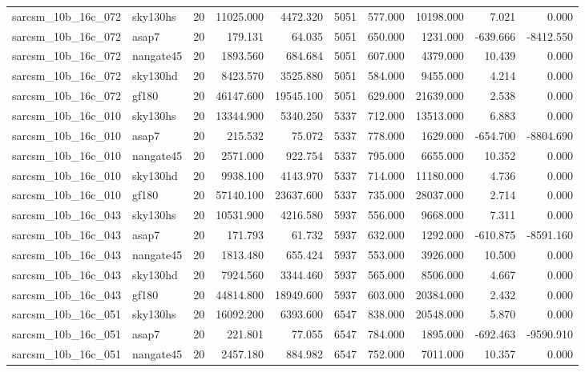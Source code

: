 \begin{longtable}{llrrrrrrrr}
sarcsm\_10b\_16c\_072 & sky130hs & 20 & 11025.000 & 4472.320 & 5051 & 577.000 & 10198.000 & 7.021 & 0.000 \\
sarcsm\_10b\_16c\_072 & asap7 & 20 & 179.131 & 64.035 & 5051 & 650.000 & 1231.000 & -639.666 & -8412.550 \\
sarcsm\_10b\_16c\_072 & nangate45 & 20 & 1893.560 & 684.684 & 5051 & 607.000 & 4379.000 & 10.439 & 0.000 \\
sarcsm\_10b\_16c\_072 & sky130hd & 20 & 8423.570 & 3525.880 & 5051 & 584.000 & 9455.000 & 4.214 & 0.000 \\
sarcsm\_10b\_16c\_072 & gf180 & 20 & 46147.600 & 19545.100 & 5051 & 629.000 & 21639.000 & 2.538 & 0.000 \\
sarcsm\_10b\_16c\_010 & sky130hs & 20 & 13344.900 & 5340.250 & 5337 & 712.000 & 13513.000 & 6.883 & 0.000 \\
sarcsm\_10b\_16c\_010 & asap7 & 20 & 215.532 & 75.072 & 5337 & 778.000 & 1629.000 & -654.700 & -8804.690 \\
sarcsm\_10b\_16c\_010 & nangate45 & 20 & 2571.000 & 922.754 & 5337 & 795.000 & 6655.000 & 10.352 & 0.000 \\
sarcsm\_10b\_16c\_010 & sky130hd & 20 & 9938.100 & 4143.970 & 5337 & 714.000 & 11180.000 & 4.736 & 0.000 \\
sarcsm\_10b\_16c\_010 & gf180 & 20 & 57140.100 & 23637.600 & 5337 & 735.000 & 28037.000 & 2.714 & 0.000 \\
sarcsm\_10b\_16c\_043 & sky130hs & 20 & 10531.900 & 4216.580 & 5937 & 556.000 & 9668.000 & 7.311 & 0.000 \\
sarcsm\_10b\_16c\_043 & asap7 & 20 & 171.793 & 61.732 & 5937 & 632.000 & 1292.000 & -610.875 & -8591.160 \\
sarcsm\_10b\_16c\_043 & nangate45 & 20 & 1813.480 & 655.424 & 5937 & 553.000 & 3926.000 & 10.500 & 0.000 \\
sarcsm\_10b\_16c\_043 & sky130hd & 20 & 7924.560 & 3344.460 & 5937 & 565.000 & 8506.000 & 4.667 & 0.000 \\
sarcsm\_10b\_16c\_043 & gf180 & 20 & 44814.800 & 18949.600 & 5937 & 603.000 & 20384.000 & 2.432 & 0.000 \\
sarcsm\_10b\_16c\_051 & sky130hs & 20 & 16092.200 & 6393.600 & 6547 & 838.000 & 20548.000 & 5.870 & 0.000 \\
sarcsm\_10b\_16c\_051 & asap7 & 20 & 221.801 & 77.055 & 6547 & 784.000 & 1895.000 & -692.463 & -9590.910 \\
sarcsm\_10b\_16c\_051 & nangate45 & 20 & 2457.180 & 884.982 & 6547 & 752.000 & 7011.000 & 10.357 & 0.000 \\

\end{longtable}

